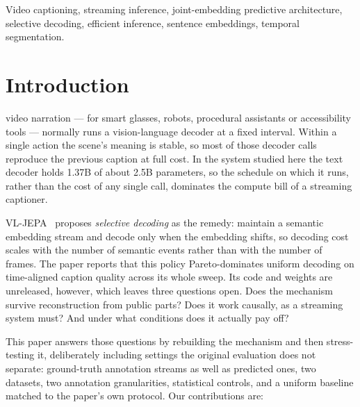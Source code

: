\documentclass[journal]{IEEEtran}
\begin{document}
\begin{IEEEkeywords}
Video captioning, streaming inference, joint-embedding predictive architecture,
selective decoding, efficient inference, sentence embeddings, temporal
segmentation.
\end{IEEEkeywords}

\IEEEpeerreviewmaketitle

\section{Introduction}
 video narration --- for smart glasses, robots,
procedural assistants or accessibility tools --- normally runs a vision-language
decoder at a fixed interval. Within a single action the scene's meaning is stable,
so most of those decoder calls reproduce the previous caption at full cost. In the
system studied here the text decoder holds 1.37B of about 2.5B parameters, so the
schedule on which it runs, rather than the cost of any single call, dominates the
compute bill of a streaming captioner.

VL-JEPA~\cite{vljepa2025} proposes \emph{selective decoding} as the remedy:
maintain a semantic embedding stream and decode only when the embedding shifts, so
decoding cost scales with the number of semantic events rather than with the
number of frames. The paper reports that this policy Pareto-dominates uniform
decoding on time-aligned caption quality across its whole sweep. Its code and
weights are unreleased, however, which leaves three questions open. Does the
mechanism survive reconstruction from public parts? Does it work causally, as a
streaming system must? And under what conditions does it actually pay off?

This paper answers those questions by rebuilding the mechanism and then
stress-testing it, deliberately including settings the original evaluation does
not separate: ground-truth annotation streams as well as predicted ones, two
datasets, two annotation granularities, statistical controls, and a uniform
baseline matched to the paper's own protocol.
Our contributions are:
\end{document}
